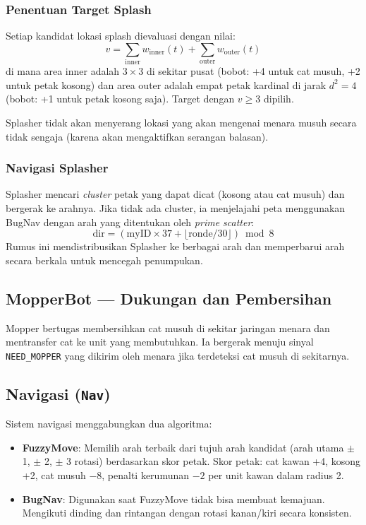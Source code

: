\documentclass[12pt, a4paper]{article}
\begin{document}
\subsubsection*{Penentuan Target Splash}

Setiap kandidat lokasi splash dievaluasi dengan nilai:
\[
    v = \sum_{\text{inner}} w_{\text{inner}}(t) + \sum_{\text{outer}} w_{\text{outer}}(t)
\]
di mana area inner adalah $3\times3$ di sekitar pusat (bobot: +4 untuk cat musuh,
+2 untuk petak kosong) dan area outer adalah empat petak kardinal di jarak $d^2=4$
(bobot: +1 untuk petak kosong saja). Target dengan $v \geq 3$ dipilih.

Splasher tidak akan menyerang lokasi yang akan mengenai menara musuh secara tidak
sengaja (karena akan mengaktifkan serangan balasan).

\subsubsection*{Navigasi Splasher}

Splasher mencari \textit{cluster} petak yang dapat dicat (kosong atau cat musuh)
dan bergerak ke arahnya. Jika tidak ada cluster, ia menjelajahi peta menggunakan
BugNav dengan arah yang ditentukan oleh \textit{prime scatter}:
\[
    \text{dir} = (\text{myID} \times 37 + \lfloor \text{ronde}/30 \rfloor) \bmod 8
\]
Rumus ini mendistribusikan Splasher ke berbagai arah dan memperbarui arah secara
berkala untuk mencegah penumpukan.

\subsection{MopperBot --- Dukungan dan Pembersihan}

Mopper bertugas membersihkan cat musuh di sekitar jaringan menara dan mentransfer
cat ke unit yang membutuhkan. Ia bergerak menuju sinyal \texttt{NEED\_MOPPER} yang
dikirim oleh menara jika terdeteksi cat musuh di sekitarnya.

\subsection{Navigasi (\texttt{Nav})}

Sistem navigasi menggabungkan dua algoritma:

\begin{itemize}
    \item \textbf{FuzzyMove}: Memilih arah terbaik dari tujuh arah kandidat
          (arah utama $\pm$ 1, $\pm$ 2, $\pm$ 3 rotasi) berdasarkan skor petak.
          Skor petak: cat kawan +4, kosong +2, cat musuh $-8$, penalti kerumunan
          $-2$ per unit kawan dalam radius 2.
    \item \textbf{BugNav}: Digunakan saat FuzzyMove tidak bisa membuat kemajuan.
          Mengikuti dinding dan rintangan dengan rotasi kanan/kiri secara konsisten.
\end{itemize}
\end{document}
